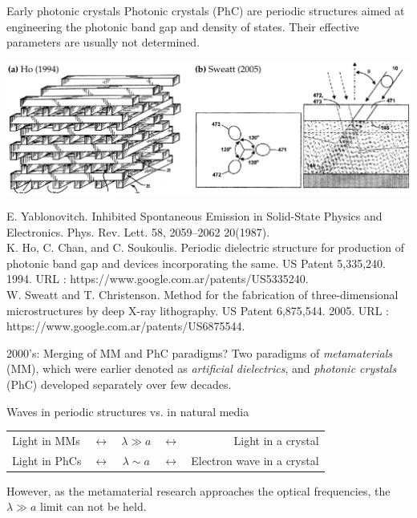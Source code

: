 \documentclass[t]{beamer} \usepackage[english]{babel} \usepackage[utf8]{inputenc} \usetheme{Frankfurt} %
\begin{document}
\begin{frame}{Early photonic crystals} 		%
\vspace{-.5em}
Photonic crystals (PhC) are periodic structures aimed at engineering the photonic band gap and density of states. 
Their effective parameters are usually not determined.


\vfill
\includegraphics[width=\textwidth]{../img/patents/phc_patents.pdf} 
\vfill

\tiny{E. Yablonovitch. Inhibited Spontaneous Emission in Solid-State Physics and Electronics. Phys. Rev. Lett. 58, 2059–2062 20(1987).\\
K. Ho, C. Chan, and C. Soukoulis. Periodic dielectric structure for production of photonic band gap and devices incorporating the same. US Patent 5,335,240. 1994.  URL : https://www.google.com.ar/patents/US5335240.\\
W. Sweatt and T. Christenson. Method for the fabrication of three-dimensional microstructures by deep X-ray lithography. US Patent 6,875,544. 2005. URL : https://www.google.com.ar/patents/US6875544.  }
\end{frame} 		%

\begin{frame}{2000's: Merging of MM and PhC paradigms?} 		%
Two paradigms of \textit{metamaterials} (MM), which were earlier denoted as \textit{artificial dielectrics}, and \textit{photonic crystals} (PhC) developed separately over few decades.

\begin{exampleblock}{Waves in periodic structures vs. in natural media}
\centering \begin{tabular}{lcccr}
Light in MMs    &$\leftrightarrow$  &$\lambda \gg a$ &$\leftrightarrow$ 	& Light in a crystal         	\\
Light in PhCs   &$\leftrightarrow$  &$\lambda \sim a$ &$\leftrightarrow$ 	& Electron wave in a crystal 	\\
\end{tabular}
\end{exampleblock}

However, as the metamaterial research approaches the optical frequencies,  the $\lambda \gg a$ limit can not be held.
\vspace{.5em}
\end{frame} 		%
\end{document}
